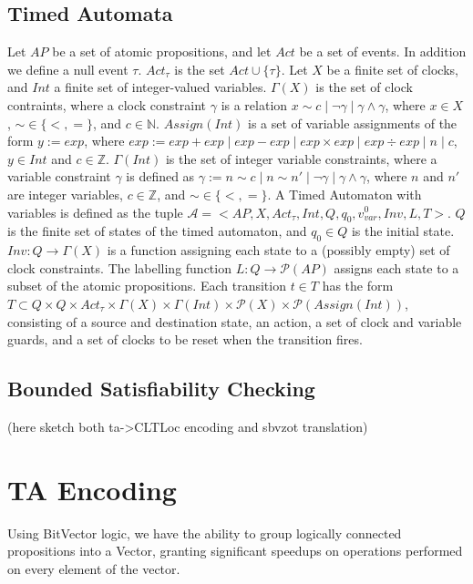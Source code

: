 \documentclass[a4paper,11pt]{article}
\newcommand*\BitOr{\mathbin{|}}
\begin{document}
\subsection{Timed Automata}
\label{sec:org432c3ad}
Let \(AP\) be a set of atomic propositions, and let \(Act\) be a set of events.
In addition we define a null event \(\tau\). \(Act_{\tau}\) is the set \(Act
\cup \{\tau\}\). Let \(X\) be a finite set of clocks, and \(Int\) a finite set
of integer-valued variables. \(\Gamma(X)\) is the set of clock contraints, where
a clock constraint \(\gamma\) is a relation \(x \sim c \BitOr \neg \gamma\BitOr
\gamma \land \gamma\), where \(x \in X\), \(\sim \in \{<,=\}\), and \(c \in
\mathbb{N}\). \(Assign(Int)\) is a set of variable assignments of the form \(y
:= exp\), where \(exp := exp + exp\BitOr exp - exp\BitOr exp \times exp\BitOr exp \div
exp\BitOr n\BitOr c\), \(y \in Int\) and \(c \in \mathbb{Z}\). \(\Gamma(Int)\) is
the set of integer variable constraints, where a variable constraint \(\gamma\)
is defined as \(\gamma := n \sim c\BitOr n \sim n'\BitOr \neg \gamma\BitOr \gamma
\land \gamma\), where \(n\) and \(n'\) are integer variables, \(c \in
\mathbb{Z}\), and \(\sim \in \{<,=\}\). A Timed Automaton with variables is
defined as the tuple \(\mathcal{A} = <AP,X, Act_{\tau}, Int, Q, q_0, v_{var}^0,
Inv, L, T>\). \(Q\) is the finite set of states of the timed automaton, and
\(q_0 \in Q\) is the initial state. \(Inv : Q \rightarrow \Gamma(X)\) is a
function assigning each state to a (possibly empty) set of clock constraints.
The labelling function \(L: Q \rightarrow \mathcal{P}(AP)\) assigns each state
to a subset of the atomic propositions. Each transition \(t \in T\)
has the form \(T \subset Q \times Q \times Act_{\tau} \times \Gamma(X)
\times \Gamma(Int) \times \mathcal{P}(X) \times \mathcal{P}(Assign(Int))\),
consisting of a source and destination state, an action, a set of clock and
variable guards, and a set of clocks to be reset when the transition fires.

\subsection{Bounded Satisfiability Checking}
\label{sec:org7c68252}
(here sketch both ta->CLTLoc encoding and sbvzot translation)
\section{TA Encoding}
\label{sec:org592ca22}
Using BitVector logic, we have the ability to group logically connected
propositions into a Vector, granting significant speedups on operations
performed on every element of the vector.
\end{document}

